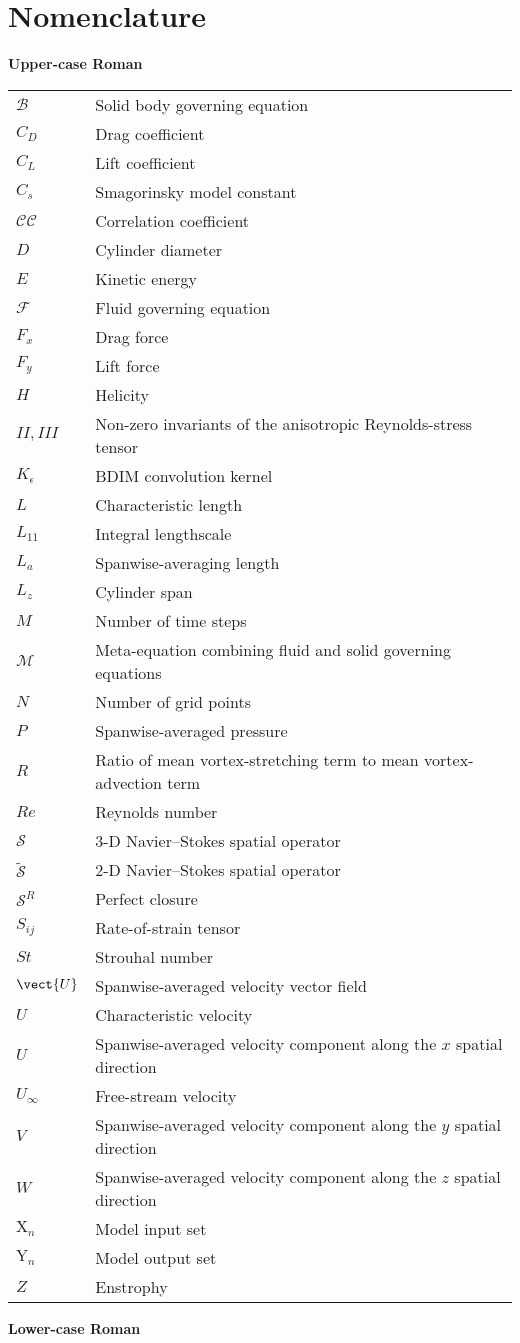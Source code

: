 \chapter{Nomenclature}

\textbf{{\large Upper-case Roman}}

\begin{longtable}[l]{ll}
$\mathcal{B}$ & Solid body governing equation\tabularnewline
$C_D$ & Drag coefficient\tabularnewline
$C_L$ & Lift coefficient\tabularnewline
$C_s$ & Smagorinsky model constant\tabularnewline
$\mathcal{CC}$ & Correlation coefficient\tabularnewline
$D$ & Cylinder diameter\tabularnewline
$E$ & Kinetic energy \tabularnewline
$\mathcal{F}$ & Fluid governing equation\tabularnewline
$F_x$ & Drag force\tabularnewline
$F_y$ & Lift force\tabularnewline
$H$ & Helicity \tabularnewline
$II, III$ & Non-zero invariants of the anisotropic Reynolds-stress tensor \tabularnewline
$K_\epsilon$ & BDIM convolution kernel \tabularnewline
$L$ & Characteristic length\tabularnewline
$L_{11}$ & Integral lengthscale\tabularnewline
$L_a$ & Spanwise-averaging length\tabularnewline
$L_z$ & Cylinder span\tabularnewline
$M$ & Number of time steps\tabularnewline
$\mathcal{M}$ & Meta-equation combining fluid and solid governing equations\tabularnewline
$N$ & Number of grid points\tabularnewline
$P$ & Spanwise-averaged pressure\tabularnewline
$R$ & Ratio of mean vortex-stretching term to mean vortex-advection term\tabularnewline
$Re$ & Reynolds number \tabularnewline
$\mathcal{S}$ & 3-D Navier--Stokes spatial operator \tabularnewline
$\tilde{\mathcal{S}}$ & 2-D Navier--Stokes spatial operator \tabularnewline
$\mathcal{S}^R$ & Perfect closure \tabularnewline
$S_{ij}$ & Rate-of-strain tensor \tabularnewline
$St$ & Strouhal number \tabularnewline
$\vect{U}$ & Spanwise-averaged velocity vector field \tabularnewline
$U$ & Characteristic velocity\tabularnewline
$U$ & Spanwise-averaged velocity component along the $x$ spatial direction\tabularnewline
$U_\infty$ & Free-stream velocity\tabularnewline
$V$ & Spanwise-averaged velocity component along the $y$ spatial direction\tabularnewline
$W$ & Spanwise-averaged velocity component along the $z$ spatial direction\tabularnewline
$\mathrm{X}_n$ & Model input set\tabularnewline
$\mathrm{Y}_n$ & Model output set\tabularnewline
$Z$ & Enstrophy \tabularnewline
\end{longtable}

\textbf{{\large Lower-case Roman}}

